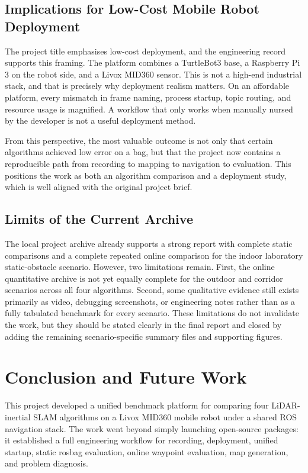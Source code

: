\documentclass[12pt,a4paper]{report}
\begin{document}
\section{Implications for Low-Cost Mobile Robot Deployment}
The project title emphasises low-cost deployment, and the engineering record supports this framing. The platform combines a TurtleBot3 base, a Raspberry Pi 3 on the robot side, and a Livox MID360 sensor. This is not a high-end industrial stack, and that is precisely why deployment realism matters. On an affordable platform, every mismatch in frame naming, process startup, topic routing, and resource usage is magnified. A workflow that only works when manually nursed by the developer is not a useful deployment method.

From this perspective, the most valuable outcome is not only that certain algorithms achieved low error on a bag, but that the project now contains a reproducible path from recording to mapping to navigation to evaluation. This positions the work as both an algorithm comparison and a deployment study, which is well aligned with the original project brief.

\section{Limits of the Current Archive}
The local project archive already supports a strong report with complete static comparisons and a complete repeated online comparison for the indoor laboratory static-obstacle scenario. However, two limitations remain. First, the online quantitative archive is not yet equally complete for the outdoor and corridor scenarios across all four algorithms. Second, some qualitative evidence still exists primarily as video, debugging screenshots, or engineering notes rather than as a fully tabulated benchmark for every scenario. These limitations do not invalidate the work, but they should be stated clearly in the final report and closed by adding the remaining scenario-specific summary files and supporting figures.

\chapter{Conclusion and Future Work}
This project developed a unified benchmark platform for comparing four LiDAR-inertial SLAM algorithms on a Livox MID360 mobile robot under a shared ROS navigation stack. The work went beyond simply launching open-source packages: it established a full engineering workflow for recording, deployment, unified startup, static rosbag evaluation, online waypoint evaluation, map generation, and problem diagnosis.
\end{document}
